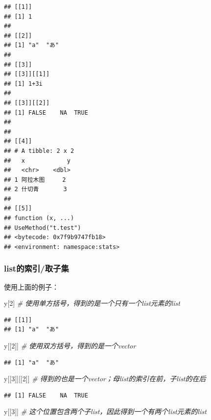 \documentclass[]{book}
\newenvironment{Shaded}{\begin{snugshade}}{\end{snugshade}}
\newcommand{\CommentTok}[1]{\textcolor[rgb]{0.56,0.35,0.01}{\textit{#1}}}
\newcommand{\DecValTok}[1]{\textcolor[rgb]{0.00,0.00,0.81}{#1}}
\newcommand{\NormalTok}[1]{#1}
\begin{document}
\begin{verbatim}
## [[1]]
## [1] 1
## 
## [[2]]
## [1] "a"  "あ"
## 
## [[3]]
## [[3]][[1]]
## [1] 1+3i
## 
## [[3]][[2]]
## [1] FALSE    NA  TRUE
## 
## 
## [[4]]
## # A tibble: 2 x 2
##   x            y
##   <chr>    <dbl>
## 1 阿拉木图     2
## 2 什切青       3
## 
## [[5]]
## function (x, ...) 
## UseMethod("t.test")
## <bytecode: 0x7f9b9747fb18>
## <environment: namespace:stats>
\end{verbatim}

\hypertarget{list}{%
\subsubsection{list的索引/取子集}\label{list}}

使用上面的例子：

\begin{Shaded}
\begin{Highlighting}[]
\NormalTok{y[}\DecValTok{2}\NormalTok{] }\CommentTok{# 使用单方括号，得到的是一个只有一个list元素的list}
\end{Highlighting}
\end{Shaded}

\begin{verbatim}
## [[1]]
## [1] "a"  "あ"
\end{verbatim}

\begin{Shaded}
\begin{Highlighting}[]
\NormalTok{y[[}\DecValTok{2}\NormalTok{]] }\CommentTok{# 使用双方括号，得到的是一个vector}
\end{Highlighting}
\end{Shaded}

\begin{verbatim}
## [1] "a"  "あ"
\end{verbatim}

\begin{Shaded}
\begin{Highlighting}[]
\NormalTok{y[[}\DecValTok{3}\NormalTok{]][[}\DecValTok{2}\NormalTok{]] }\CommentTok{# 得到的也是一个vector；母list的索引在前，子list的在后}
\end{Highlighting}
\end{Shaded}

\begin{verbatim}
## [1] FALSE    NA  TRUE
\end{verbatim}

\begin{Shaded}
\begin{Highlighting}[]
\NormalTok{y[[}\DecValTok{3}\NormalTok{]] }\CommentTok{# 这个位置包含两个子list，因此得到一个有两个list元素的list}
\end{Highlighting}
\end{Shaded}
\end{document}
